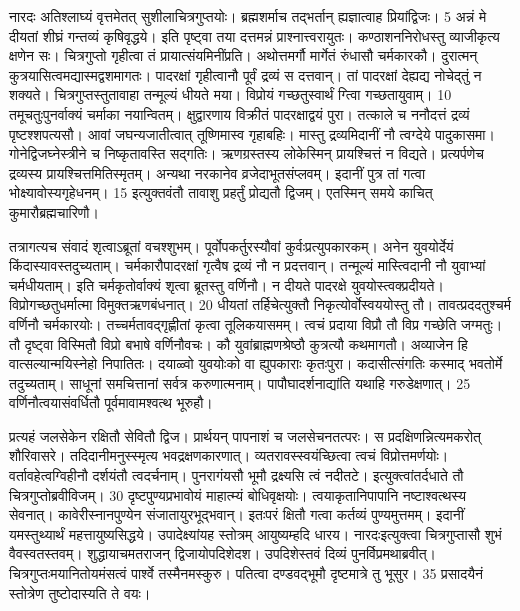 नारदः
अतिश्लाघ्यं वृत्तमेतत् सुशीलाचित्रगुप्तयोः।
 ब्रह्मशर्माच तद्भर्तान् ह्यज्ञात्वाह प्रियांद्विजः।
 5
अन्नं मे दीयतां शीघ्रं गन्तव्यं कृषिवृद्धये।
 इति पृष्ट्वा तया दत्तमन्नं प्राश्नात्त्वरायुतः।
 कण्ठाशननिरोधस्तु व्याजीकृत्य क्षणेन सः।
 चित्रगुप्तो गृहीत्वा तं प्रायात्संयमिनींप्रति।
 अथोत्तमर्गौ मार्गेतं रुंधासौ चर्मकारकौ।
 दुरात्मन् कुत्रयासित्वमद्यास्मद्वशमागतः।
 पादरक्षां गृहीत्वानौ पूर्वं द्रव्यं स दत्तवान्।
 तां पादरक्षां देह्यद्य नोचेद्तुं न शक्यते।
 चित्रगुप्तस्तुतावाहा तन्मूल्यं धीयते मया।
 विप्रोयं गच्छतुस्वार्थं ग्त्विा गच्छतायुवाम्।
 10 तमूचतुःपुनर्वाक्यं चर्माका नयान्वितम्।
 क्षुद्वारणाय विक्रीतं पादरक्षाद्वयं पुरा।
 तत्काले च ननौदत्तं द्रव्यं पृष्टश्शपत्यसौ।
 आवां जघन्यजातीत्वात् तूष्णिमास्व गृहाबहिः।
 मास्तु द्रव्यमिदानीं नौ त्वग्देये पादुकासमा।
 गोनेद्विजघ्नेस्त्रीने च निष्कृतावस्ति सद्गतिः।
 ऋणग्रस्तस्य लोकेस्मिन् प्रायश्चित्तं न विद्यते।
 प्रत्यर्पणेच द्रव्यस्य प्रायश्चित्तमितिस्मृतम्।
 अन्यथा नरकानेव व्रजेदाभूतसंप्लवम्।
 इदानीं पुत्र तां गत्वा भोक्ष्यावोस्यगृहेधनम्।
 15 इत्युक्तवंतौ तावाशु प्रहर्तुं प्रोद्यतौ द्विजम्।
 एतस्मिन् समये काचित् कुमारौब्रह्मचारिणौ।
 
तत्रागत्यच संवादं शृत्वाऽब्रूतां वचश्शुभम्।
 पूर्वोपकर्तुरस्यौवां कुर्वःप्रत्युपकारकम्।
 अनेन युवयोर्देयं किंदास्यावस्तदुच्यताम्।
 चर्मकारौपादरक्षां गृत्वैष द्रव्यं नौ न प्रदत्तवान्।
 तन्मूल्यं मास्त्विदानी नौ युवाभ्यां चर्मधीयताम्।
 इति चर्मकृतोर्वाक्यं शृत्वा ब्रूतस्तु वर्णिनौ।
 न दीयते पादरक्षे युवयोस्त्वक्प्रदीयते।
 विप्रोगच्छतुधर्मात्मा विमुक्तऋणबंधनात्।
 20 धीयतां तर्हिचेत्युक्तौ निकृत्योर्वोस्वययोस्तु तौ।
 तावत्प्रददतुश्चर्म वर्णिनौ चर्मकारयोः।
 तच्चर्मतावद्गृह्णीतां कृत्वा तूलिकयासमम्।
 त्वचं प्रदाया विप्रौ तौ विप्र गच्छेति जग्मतुः।
 तौ दृष्ट्वा विस्मितौ विप्रो बभाषे वर्णिनौवचः।
 कौ युवांब्राह्मणश्रेष्ठौ कुत्रत्यौ कथमागतौ।
 अव्याजेन हि वात्सल्यान्मयिस्नेहो निपातितः।
 दयाळ्वो युवयोःको वा ह्युपकाराः कृतःपुरा।
 कदासीत्संगतिः कस्माद् भवतोर्मे तदुच्यताम्।
 साधूनां समचित्तानां सर्वत्र करुणात्मनाम्।
 पापौघादर्शनाद्यांति यथाहि गरुडेक्षणात्।
 25 वर्णिनौत्वयासंवर्धितौ पूर्वमावामश्वत्थ भूरुहौ।

प्रत्यहं जलसेकेन रक्षितौ सेवितौ द्विज।
 प्रार्थयन् पापनाशं च जलसेचनतत्परः।
 स प्रदक्षिणन्नित्यमकरोत् शौरिवासरे।
 तदिदानीमनुस्स्मृत्य भवद्रक्षणकारणात्।
 व्यतरावस्स्वयंच्छित्वा त्वचं विप्रोत्तमर्णयोः।
 वर्तावहेत्वग्विहीनौ दर्शयंतौ त्वदर्चनाम्।
 पुनरागंयसौ भूमौ द्रक्ष्यसि त्वं नदीतटे।
 इत्युक्त्वांतर्दधाते तौ चित्रगुप्तोब्रवीविजम्।
 30 दृष्टपुण्यप्रभावोयं माहात्म्यं बोधिवृक्षयोः।
 त्वयाकृतानिपापानि नष्टाश्वत्थस्य सेवनात्।
 कावेरीस्नानपुण्येन संजातायुरभूद्भवान्।
 इतःपरं क्षितौ गत्वा कर्तव्यं पुण्यमुत्तमम्।
 इदानीं यमस्तुथ्यार्थं महत्तायुष्यसिद्धये।
 उपादेक्ष्यांयह स्तोत्रम् आयुष्यम्हदि धारय।
 नारदःइत्युक्त्वा चित्रगुप्तासौ शुभं वैवस्वतस्तवम्।
 शुद्धायाचमतराजन् द्विजायोपदिशेदश।
 उपदिशेस्तवं दिव्यं पुनर्विप्रमथाब्रवीत्।
 चित्रगुप्तःमयानितोयमंसत्वं पार्श्वे तस्मैनमस्कुरु।
 पतित्वा दण्डवद्भूमौ दृष्टमात्रे तु भूसुर।
 35 प्रसादयैनं स्तोत्रेण तुष्टोदास्यति ते वयः।

